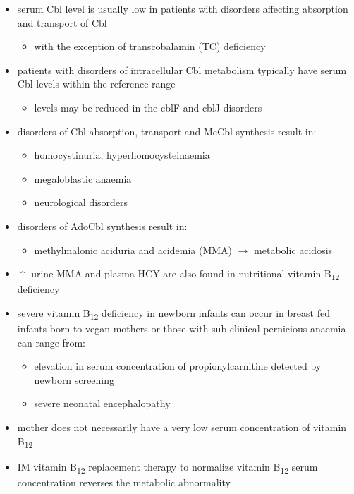 \documentclass{scrartcl}
\begin{document}
\begin{itemize}
\item serum Cbl level is usually low in patients with disorders affecting
absorption and transport of Cbl
\begin{itemize}
\item with the exception of transcobalamin (TC) deficiency
\end{itemize}
\item patients with disorders of intracellular Cbl metabolism typically
have serum Cbl levels within the reference range
\begin{itemize}
\item levels may be reduced in the cblF and cblJ disorders
\end{itemize}
\item disorders of Cbl absorption, transport and MeCbl synthesis result in:
\begin{itemize}
\item homocystinuria, hyperhomocysteinaemia
\item megaloblastic anaemia
\item neurological disorders
\end{itemize}
\item disorders of AdoCbl synthesis result in:
\begin{itemize}
\item methylmalonic aciduria and acidemia (MMA) \(\to\) metabolic
acidosis
\end{itemize}
\item \(\uparrow\) urine MMA and plasma HCY are also found in nutritional
vitamin B\textsubscript{12} deficiency
\item severe vitamin B\textsubscript{12} deficiency in newborn infants can occur in
breast fed infants born to vegan mothers or those with sub-clinical
pernicious anaemia can range from:
\begin{itemize}
\item elevation in serum concentration of propionylcarnitine detected by
newborn screening
\item severe neonatal encephalopathy
\end{itemize}
\item mother does not necessarily have a very low serum concentration of
vitamin B\textsubscript{12}
\item IM vitamin B\textsubscript{12} replacement therapy to normalize vitamin B\textsubscript{12} serum
concentration reverses the metabolic abnormality
\end{itemize}
\end{document}

